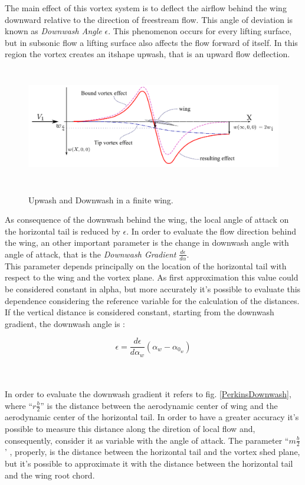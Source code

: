 The main effect of this vortex system is to deflect the airflow behind the wing downward relative to the direction of freestream flow. This angle of deviation is known as {\itshape Downwash Angle} $\epsilon$. This phenomenon occurs for every lifting surface, but in subsonic flow a lifting surface also affects the flow forward of itself. In this region the vortex creates an {itshape upwash}, that is an upward flow deflection.\\


\begin{figure}[H]
\centering
{\includegraphics[height=5.16cm]{Immagini/wing_upwash_downwash.pdf}} 
\caption{Upwash and Downwash in a finite wing.}
\end{figure}

As consequence of the downwash behind the wing, the local angle of attack on the horizontal tail is reduced by  $\epsilon$. In order to evaluate the flow direction behind the wing, an other important parameter is the change in downwash angle with angle of attack, that is the {\itshape Downwash Gradient } $\frac{d\epsilon}{d\alpha}$.\\
This parameter depends principally on the location of the horizontal tail with respect to the wing and the vortex plane. As first approximation this value could be considered constant in alpha, but more accurately it's possible to evaluate this dependence considering the reference variable for the calculation of the distances. 
If the vertical distance is considered constant, starting from the downwash gradient, the downwash angle is :

\begin{equation}
\epsilon = \frac {d \epsilon}{d \alpha_w} (\alpha_w - \alpha_{0_w})
\end{equation}

\noindent \\ \\
In order to evaluate the downwash gradient it refers to fig. \ref{PerkinsDownwash}, where ``$r \frac{b}{2}$''  is the distance between the aerodynamic center of wing and the aerodynamic center of the horizontal tail. In order to have a greater accuracy it's possible to measure this distance along the diretion of local flow and, consequently, consider it as variable with the angle of attack. The parameter ``$m\frac{b}{2}$' , properly, is the distance between the horizontal tail and the vortex shed plane, but it's possible to approximate it with the distance between the horizontal tail and the wing root chord.\cite{schimidth}

